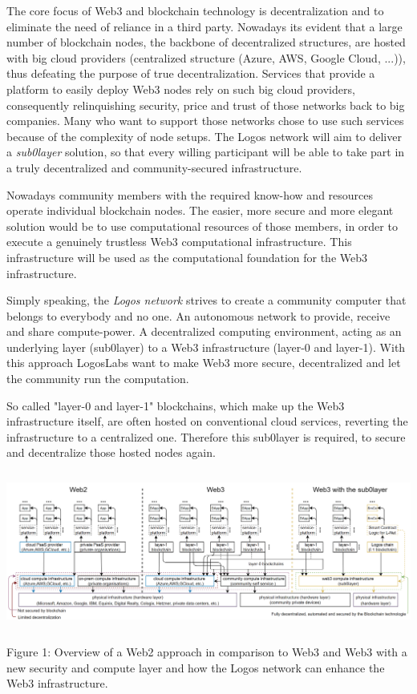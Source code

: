 \documentclass[]{article}
\begin{document}
The core focus of Web3 and blockchain technology is decentralization and to eliminate the need of reliance in a third party.
Nowadays its evident that a large number of blockchain nodes, the backbone of decentralized structures, are hosted with big cloud providers (centralized structure (Azure, AWS, Google Cloud, ...)), thus defeating the purpose of true decentralization.
Services that provide a platform to easily deploy Web3 nodes rely on such big cloud providers, consequently relinquishing security, price and trust of those networks back to big companies.
Many who want to support those networks chose to use such services because of the complexity of node setups. 
The Logos network will aim to deliver a \textit{sub0layer} solution, so that every willing participant will be able to take part in a truly decentralized and community-secured infrastructure.

Nowadays community members with the required know-how and resources operate individual blockchain nodes. 
The easier, more secure and more elegant solution would be to use computational resources of those members, in order to execute a genuinely trustless Web3 computational infrastructure. 
This infrastructure will be used as the computational foundation for the Web3 infrastructure.

Simply speaking, the \textit{Logos network} strives to create a community computer that belongs to everybody and no one.
An autonomous network to provide, receive and share compute-power.
A decentralized computing environment, acting as an underlying layer (sub0layer) to a Web3 infrastructure (layer-0 and layer-1).
With this approach LogosLabs want to make Web3 more secure, decentralized and let the community run the computation.

So called "layer-0 and layer-1" blockchains, which make up the Web3 infrastructure itself, are often hosted on conventional cloud services, reverting the infrastructure to a centralized one. 
Therefore this sub0layer is required, to secure and decentralize those hosted nodes again.

\begin{center}
	\includegraphics[height=5.2cm]{network-requirement}
\end{center}
\begin{center}
	Figure 1: Overview of a Web2 approach in comparison to Web3 and Web3 with a new security and compute layer and how the Logos network can enhance the Web3 infrastructure.
\end{center}
\end{document}
